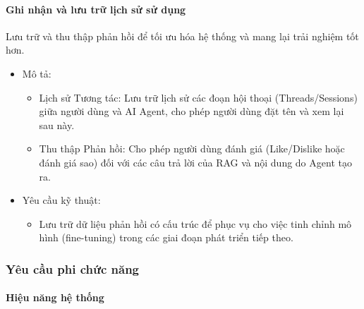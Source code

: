 \paragraph{Ghi nhận và lưu trữ lịch sử sử
dụng}\label{ghi-nhux1eadn-vuxe0-lux1b0u-trux1eef-lux1ecbch-sux1eed-sux1eed-dux1ee5ng}

Lưu trữ và thu thập phản hồi để tối ưu hóa hệ thống và mang lại trải
nghiệm tốt hơn.

\begin{itemize}
\item
  Mô tả:

  \begin{itemize}
  \item
    Lịch sử Tương tác: Lưu trữ lịch sử các đoạn hội thoại
    (Threads/Sessions) giữa người dùng và AI Agent, cho phép người dùng
    đặt tên và xem lại sau này.
  \item
    Thu thập Phản hồi: Cho phép người dùng đánh giá (Like/Dislike hoặc
    đánh giá sao) đối với các câu trả lời của RAG và nội dung do Agent
    tạo ra.
  \end{itemize}
\item
  Yêu cầu kỹ thuật:

  \begin{itemize}
  \item
    Lưu trữ dữ liệu phản hồi có cấu trúc để phục vụ cho việc tinh chỉnh
    mô hình (fine-tuning) trong các giai đoạn phát triển tiếp theo.
  \end{itemize}
\end{itemize}

\subsubsection{Yêu cầu phi chức
năng}\label{yuxeau-cux1ea7u-phi-chux1ee9c-nux103ng}

\paragraph{Hiệu năng hệ
thống}\label{hiux1ec7u-nux103ng-hux1ec7-thux1ed1ng}

